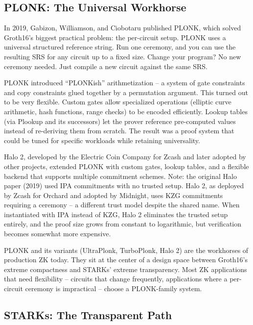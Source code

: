 \documentclass[
  11pt,
  openany]{report}
\begin{document}
\subsection{PLONK: The Universal Workhorse}\label{plonk-the-universal-workhorse}

In 2019, Gabizon, Williamson, and Ciobotaru published PLONK, which solved
Groth16's biggest practical problem: the per-circuit setup. PLONK uses a
universal structured reference string. Run one ceremony, and you can use the
resulting SRS for any circuit up to a fixed size. Change your program? No new
ceremony needed. Just compile a new circuit against the same SRS.

PLONK introduced ``PLONKish'' arithmetization -- a system of gate constraints
and copy constraints glued together by a permutation argument. This turned out
to be very flexible. Custom gates allow specialized operations (elliptic curve
arithmetic, hash functions, range checks) to be encoded efficiently. Lookup
tables (via Plookup and its successors) let the prover reference pre-computed
values instead of re-deriving them from scratch. The result was a proof system
that could be tuned for specific workloads while retaining universality.

Halo 2, developed by the Electric Coin Company for Zcash and later adopted by
other projects, extended PLONK with custom gates, lookup tables, and a flexible
backend that supports multiple commitment schemes. Note: the original Halo paper
(2019) used IPA commitments with no trusted setup. Halo 2, as deployed by Zcash
for Orchard and adopted by Midnight, uses KZG commitments requiring a ceremony
-- a different trust model despite the shared name. When instantiated with IPA
instead of KZG, Halo 2 eliminates the trusted setup entirely, and the proof size
grows from constant to logarithmic, but verification becomes somewhat more
expensive.

PLONK and its variants (UltraPlonk, TurboPlonk, Halo 2) are the workhorses of
production ZK today. They sit at the center of a design space between Groth16's
extreme compactness and STARKs' extreme transparency. Most ZK applications that
need flexibility -- circuits that change frequently, applications where a
per-circuit ceremony is impractical -- choose a PLONK-family system.

\subsection{STARKs: The Transparent Path}\label{starks-the-transparent-path}
\end{document}
